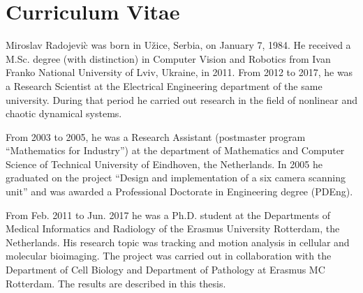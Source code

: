 %
%

\noquote
\orgchpos
\chapter*{Curriculum Vitae}

\noindent
Miroslav Radojevi\`{c} was born in U\v{z}ice, Serbia, on January 7, 1984. He received a M.Sc. degree (with distinction) in Computer Vision and Robotics from Ivan Franko National University of Lviv, Ukraine, in 2011. From 2012 to 2017, he
was a Research Scientist at the Electrical Engineering department of the same university. During that period he carried out research in the field of nonlinear and chaotic dynamical systems. 

\bigskip
\noindent
From 2003 to 2005, he was a Research Assistant (postmaster program
``Mathematics for Industry'') at the department of Mathematics and
Computer Science of Technical University of Eindhoven, the
Netherlands. In 2005 he graduated on the project ``Design and
implementation of a six camera scanning unit'' and was awarded a
Professional Doctorate in Engineering degree (PDEng). 

\bigskip
\noindent
From Feb. 2011 to Jun. 2017 he was a Ph.D. student at the Departments of Medical Informatics and Radiology of the Erasmus University Rotterdam,
the Netherlands. His research topic was tracking and motion analysis
in cellular and molecular bioimaging. The project was carried out in collaboration with
the Department of Cell Biology and Department of Pathology at Erasmus
MC Rotterdam. The results are described in this thesis.





